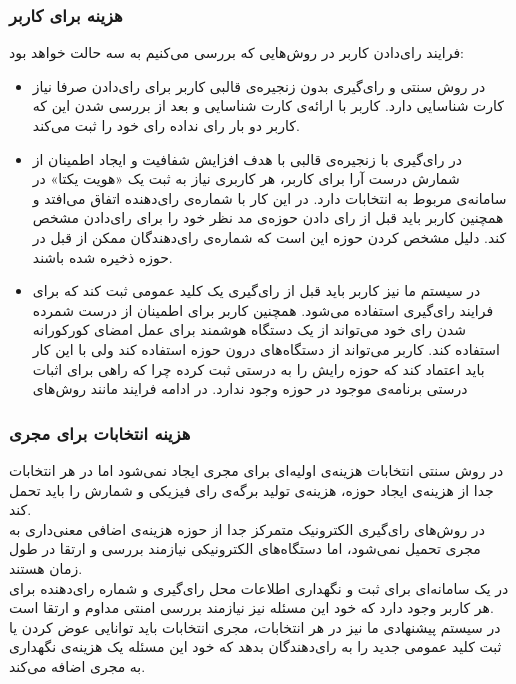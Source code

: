 \subsubsection{هزینه برای کاربر}
فرایند رای‌دادن کاربر در روش‌هایی که بررسی می‌کنیم به سه حالت خواهد بود:
\begin{itemize}
 \item 
 در روش‌ سنتی و رای‌گیری بدون زنجیره‌ی قالبی کاربر برای رای‌دادن صرفا نیاز کارت شناسایی دارد. کاربر با ارائه‌ی کارت شناسایی و بعد از بررسی شدن این که کاربر دو بار رای نداده رای خود را ثبت می‌کند. 
 \item 
 در رای‌گیری با زنجیره‌ی قالبی با هدف افزایش شفافیت و ایجاد اطمینان از شمارش درست آرا برای کاربر، هر کاربری نیاز به ثبت یک «هویت یکتا» در سامانه‌ی مربوط به انتخابات دارد. در  این کار با شماره‌ی رای‌‌دهنده اتفاق می‌افتد و همچنین کاربر باید قبل از رای‌ دادن حوزه‌ی مد نظر خود را برای رای‌دادن مشخص کند. دلیل مشخص کردن حوزه این است که شماره‌ی رای‌دهندگان ممکن از قبل در حوزه ذخیره شده باشند.
 
 \item
 در سیستم ما نیز کاربر باید قبل از رای‌گیری یک کلید عمومی ثبت کند که برای فرایند رای‌گیری استفاده می‌شود. همچنین کاربر برای اطمینان از درست شمرده شدن رای خود می‌تواند از یک دستگاه هوشمند برای عمل امضای کورکورانه استفاده کند. کاربر می‌تواند از دستگاه‌های درون حوزه استفاده کند ولی با این کار باید اعتماد کند که حوزه رایش را به درستی ثبت کرده چرا که راهی برای اثبات درستی برنامه‌ی موجود در حوزه وجود ندارد.
 در ادامه فرایند مانند روش‌های 
\end{itemize}
\subsubsection{هزینه انتخابات برای مجری}
در روش سنتی انتخابات هزینه‌ی اولیه‌ای برای مجری ایجاد نمی‌شود اما در هر انتخابات جدا از هزینه‌ی ایجاد حوزه، هزینه‌ی تولید برگه‌ی رای فیزیکی و شمارش را باید تحمل کند. 
\\
در روش‌های رای‌گیری الکترونیک متمرکز جدا از حوزه هزینه‌ی اضافی معنی‌داری به مجری تحمیل نمی‌شود، اما دستگا‌ه‌های الکترونیکی نیازمند بررسی و ارتقا در طول زمان هستند.
\\
در  یک سامانه‌ای برای ثبت و نگهداری اطلاعات محل رای‌گیری و شماره رای‌دهنده برای هر کاربر وجود دارد که خود این مسئله نیز نیازمند بررسی امنتی مداوم و ارتقا است. 
\\
در سیستم پیشنهادی ما نیز در هر انتخابات، مجری انتخابات باید توانایی عوض کردن یا ثبت کلید عمومی جدید را به رای‌دهندگان بدهد که خود این مسئله یک هزینه‌ی نگهداری به مجری اضافه می‌کند. 
